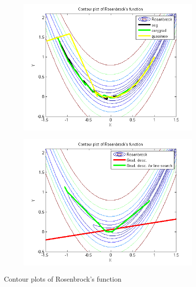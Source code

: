 \documentclass{article}
\begin{document}
\begin{figure}[H]
	\centering
	\begin{subfigure}[b]{0.45\textwidth}
		\includegraphics[width=\textwidth]{rosenbrocktask1.png}
		\label{fig:rosenbrocktask1}
	\end{subfigure}
	\begin{subfigure}[b]{0.45\textwidth}
		\includegraphics[width=\textwidth]{rosenbrocktask12.png}
		\label{fig:rosenbrocktask1}
	\end{subfigure}	
	\caption{Contour plots of Rosenbrock's function}
\end{figure}
\end{document}
